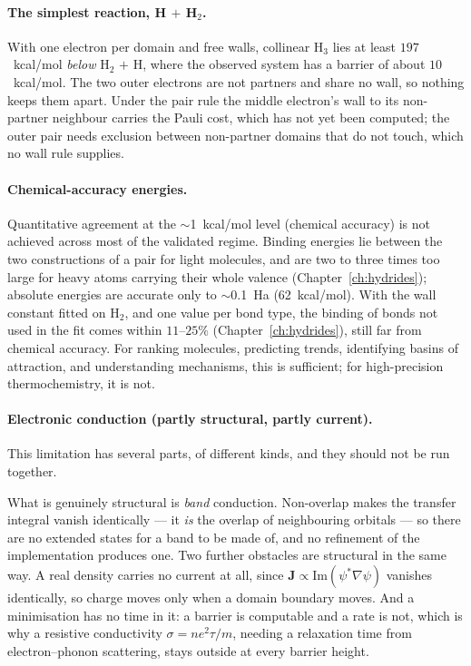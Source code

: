 \paragraph{The simplest reaction, H $+$ H$_2$.}
With one electron per domain and free walls, collinear H$_3$ lies at least $197$~kcal/mol \emph{below} H$_2$ $+$ H, where the observed system has a barrier of about $10$~kcal/mol. The two outer electrons are not partners and share no wall, so nothing keeps them apart. Under the pair rule the middle electron's wall to its non-partner neighbour carries the Pauli cost, which has not yet been computed; the outer pair needs exclusion between non-partner domains that do not touch, which no wall rule supplies.

\paragraph{Chemical-accuracy energies.}
Quantitative agreement at the $\sim$1~kcal/mol level (chemical accuracy) is not achieved across most of the validated regime. Binding energies lie between the two constructions of a pair for light molecules, and are two to three times too large for heavy atoms carrying their whole valence (Chapter~\ref{ch:hydrides}); absolute energies are accurate only to $\sim$0.1~Ha (62~kcal/mol). With the wall constant fitted on H$_2$, and one value per bond type, the binding of bonds not used in the fit comes within $11$--$25\%$ (Chapter~\ref{ch:hydrides}), still far from chemical accuracy. For ranking molecules, predicting trends, identifying basins of attraction, and understanding mechanisms, this is sufficient; for high-precision thermochemistry, it is not.

\paragraph{Electronic conduction \textnormal{(partly structural, partly current)}.}
This limitation has several parts, of different kinds, and they should not be run together.

What is genuinely structural is \emph{band} conduction. Non-overlap makes the transfer integral
vanish identically --- it \emph{is} the overlap of neighbouring orbitals --- so there are no extended
states for a band to be made of, and no refinement of the implementation produces one. Two further
obstacles are structural in the same way. A real density carries no current at all, since $\mathbf
J\propto\mathrm{Im}(\psi^*\nabla\psi)$ vanishes identically, so charge moves only when a domain
boundary moves. And a minimisation has no time in it: a barrier is computable and a rate is not,
which is why a resistive conductivity $\sigma=ne^2\tau/m$, needing a relaxation time from
electron--phonon scattering, stays outside at every barrier height.

